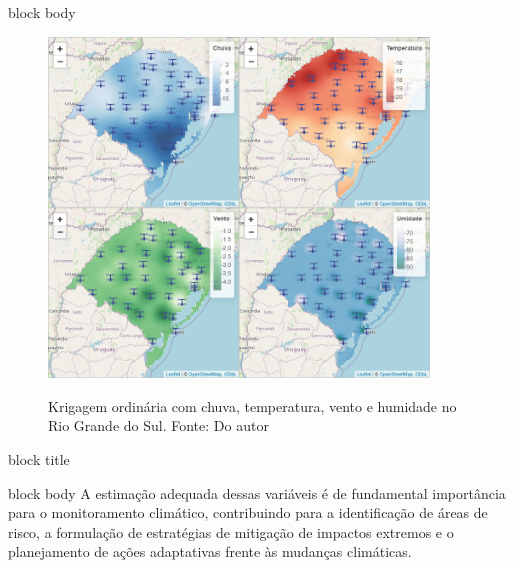 \documentclass[final]{beamer}
\newlength{\colwidth}
\begin{document}
\begin{frame}[t]
\begin{columns}[t]
\begin{column}{\colwidth}
\begin{beamercolorbox}[wd=\colwidth, sep=2pt, leftskip=2pt, rightskip=2pt]{block body}
\begin{figure}[h!]  
\begin{center}
    
        \includegraphics[width=0.9\textwidth]{./img/krig_ord/Foto_td_var.png}
        \label{fig:Foto_td}
    
    \caption{Krigagem ordinária com chuva,  temperatura, vento e humidade no Rio Grande do Sul. Fonte: Do autor}
    \end{center}
\end{figure}    
   
  \vspace{4pt}
\end{beamercolorbox}

\begin{beamercolorbox}[wd=\colwidth, sep=6pt, leftskip=6pt, rightskip=6pt]{block title}
 \fontsize{20}{22}\selectfont {}
\end{beamercolorbox}
\begin{beamercolorbox}[wd=\colwidth, sep=2pt, leftskip=2pt, rightskip=2pt]{block body}
  \vspace{-2pt} %
  A estimação adequada dessas variáveis é de fundamental importância para o monitoramento climático, contribuindo para a identificação de áreas de risco, a formulação de estratégias de mitigação de impactos extremos e o planejamento de ações adaptativas frente às mudanças  climáticas.
  \vspace{4pt}
\end{beamercolorbox}


\end{column}
\end{columns}
\end{frame}
\end{document}

